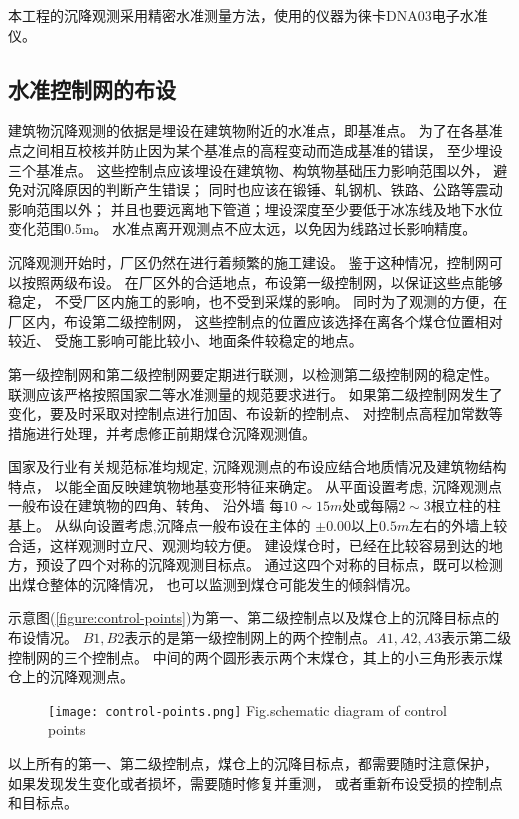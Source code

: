 本工程的沉降观测采用精密水准测量方法，使用的仪器为徕卡DNA03电子水准仪。

\subsection{水准控制网的布设}
建筑物沉降观测的依据是埋设在建筑物附近的水准点，即基准点。
为了在各基准点之间相互校核并防止因为某个基准点的高程变动而造成基准的错误，
至少埋设三个基准点。
这些控制点应该埋设在建筑物、构筑物基础压力影响范围以外，
避免对沉降原因的判断产生错误；
同时也应该在锻锤、轧钢机、铁路、公路等震动影响范围以外；
并且也要远离地下管道；埋设深度至少要低于冰冻线及地下水位变化范围0.5m。
水准点离开观测点不应太远，以免因为线路过长影响精度。

沉降观测开始时，厂区仍然在进行着频繁的施工建设。
鉴于这种情况，控制网可以按照两级布设。
在厂区外的合适地点，布设第一级控制网，以保证这些点能够稳定，
不受厂区内施工的影响，也不受到采煤的影响。
同时为了观测的方便，在厂区内，布设第二级控制网，
这些控制点的位置应该选择在离各个煤仓位置相对较近、
受施工影响可能比较小、地面条件较稳定的地点。

第一级控制网和第二级控制网要定期进行联测，以检测第二级控制网的稳定性。
联测应该严格按照国家二等水准测量的规范要求进行。
如果第二级控制网发生了变化，要及时采取对控制点进行加固、布设新的控制点、
对控制点高程加常数等措施进行处理，并考虑修正前期煤仓沉降观测值。

国家及行业有关规范标准均规定,
沉降观测点的布设应结合地质情况及建筑物结构特点，
以能全面反映建筑物地基变形特征来确定。
从平面设置考虑, 沉降观测点一般布设在建筑物的四角、转角、
沿外墙 每$10\sim15m$处或每隔$2\sim3$根立柱的柱基上。
从纵向设置考虑,沉降点一般布设在主体的
$± 0.00$以上$0.5m$左右的外墙上较合适，这样观测时立尺、观测均较方便。
建设煤仓时，已经在比较容易到达的地方，预设了四个对称的沉降观测目标点。
通过这四个对称的目标点，既可以检测出煤仓整体的沉降情况，
也可以监测到煤仓可能发生的倾斜情况。

示意图(\ref{figure:control-points})为第一、第二级控制点以及煤仓上的沉降目标点的布设情况。
$B1, B2$表示的是第一级控制网上的两个控制点。$A1, A2, A3$表示第二级控制网的三个控制点。
中间的两个圆形表示两个末煤仓，其上的小三角形表示煤仓上的沉降观测点。
\begin{figure}[!htbp]
   \centering
   \texttt{[image: control-points.png]}
			{Fig.}{schematic diagram of control points}
\end{figure}

以上所有的第一、第二级控制点，煤仓上的沉降目标点，都需要随时注意保护，
如果发现发生变化或者损坏，需要随时修复并重测，
或者重新布设受损的控制点和目标点。

